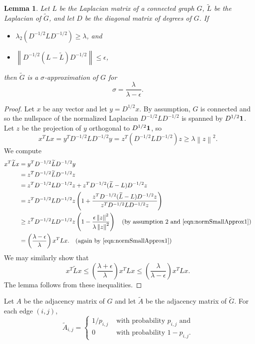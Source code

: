 \documentclass[11pt]{article}
\newtheorem{lemma}[theorem]{Lemma}
\def\Gtil{\widetilde{G}}
\def\Ltil{\widetilde{L}}
\def\Atil{\widetilde{A}}
\def\norm#1{\left\| #1 \right\|}
\def\bvec#1{{\mbox{\boldmath $#1$}}}
\begin{document}
\begin{lemma}\label{lem:normSmallApprox}
Let $L$ be the Laplacian matrix of a connected graph $G$, $\Ltil$ be the Laplacian of $\Gtil$,
  and let $D$ be the diagonal matrix of degrees of $G$.
If
\begin{itemize}
\item [1.] $\lambda_{2} \left(D^{-1/2} L D^{-1/2} \right) \geq \lambda $, and
\item [2.] $\norm{D^{-1/2} (L - \Ltil)D^{-1/2}} \leq \epsilon$,
\end{itemize}
then $\Gtil$ is a $\sigma$-approximation of $G$ for
\[
  \sigma = \frac{\lambda}{\lambda - \epsilon}.
\]
\end{lemma}
\begin{proof}
Let $x$ be any vector and let $y = D^{1/2} x$.
By assumption, $G$ is connected and so
  the nullspace of the normalized Laplacian $D^{-1/2} L D^{-1/2}$
  is spanned by $D^{1/2} \bvec{1}$.
Let $z$ be the projection of $y$ orthogonal to
  $D^{1/2} \bvec{1}$, so
\begin{equation}\label{eqn:normSmallApprox1}
  x^{T} L x =
  y^{T} D^{-1/2} L D^{-1/2} y =
  z^{T} \left(D^{-1/2} L D^{-1/2} \right) z \geq \lambda \norm{z}^{2}.
\end{equation}
We compute
\begin{align*}
  x^{T} \Ltil x
 & =
  y^{T} D^{-1/2} \Ltil D^{-1/2} y \\
 & =
  z^{T} D^{-1/2} \Ltil D^{-1/2} z \\
 & =
  z^{T} D^{-1/2} L D^{-1/2} z
+
  z^{T} D^{-1/2} (\Ltil-L) D^{-1/2} z \\
 & =
  z^{T} D^{-1/2} L D^{-1/2} z
\left(
1 +
\frac{z^{T} D^{-1/2} (\Ltil-L) D^{-1/2} z}
     {  z^{T} D^{-1/2} L D^{-1/2} z }
 \right)
   \\
 & \geq
  z^{T} D^{-1/2} L D^{-1/2} z
\left(
1 -
\frac{\epsilon \norm{z}^{2}}
     {\lambda \norm{z}^{2}}
\right)
\quad
\text{(by assumption 2 and \eqref{eqn:normSmallApprox1})}
\\
& = \left(\frac{\lambda -\epsilon}{\lambda} \right) x^{T} L x.
\quad \text{(again by \eqref{eqn:normSmallApprox1})}
\end{align*}
We may similarly show that
\[
x^{T} \Ltil x \leq \left(\frac{\lambda +\epsilon}{\lambda} \right) x^{T} L x \leq \left(\frac{\lambda}{\lambda -\epsilon} \right) x^{T} L x.
\]
The lemma follows from these inequalities.
\end{proof}

Let $A$ be the adjacency matrix of $G$ and let $\Atil$ be the adjacency matrix
  of $\Gtil$.
For each edge $(i,j)$,
\[
  \Atil_{i,j} =
\begin{cases}
1 / p_{i,j} &
\text{ with probability $p_{i,j}$ and}
\\
0  & \text{ with probability $1-p_{i,j}$.}
\end{cases}
\]
\end{document}
